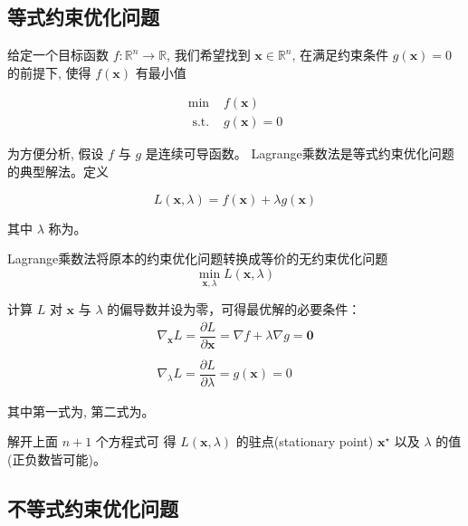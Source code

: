\subsection{等式约束优化问题}

\begin{problem}[等式约束优化问题]
    给定一个目标函数 $ f: \mathbb{R}^{n} \rightarrow \mathbb{R} $, 我们希望找到 $ \mathbf{x} \in \mathbb{R}^{n} $, 在满足约束条件 $ g(\mathbf{x})=0 $ 的前提下, 使得 $ f(\mathbf{x}) $ 有最小值

    $$
\begin{array}{ll}
\min & f(\mathbf{x}) \\
\text { s.t. } & g(\mathbf{x})=0
\end{array}
$$
\end{problem}

为方便分析, 假设 $ f $ 与 $ g $ 是连续可导函数。 Lagrange乘数法是等式约束优化问题的典型解法。定义

\begin{definition}[Lagrangian函数]
    $$
L(\mathbf{x}, \lambda)=f(\mathbf{x})+\lambda g(\mathbf{x})
$$
\end{definition}

其中 $ \lambda $ 称为。 

\begin{theorem}
    Lagrange乘数法将原本的约束优化问题转换成等价的无约束优化问题
$$
\min _{\mathbf{x}, \lambda} L(\mathbf{x}, \lambda)
$$
\end{theorem}

\begin{theorem}[拉格朗日乘子法最优解必要条件]
    计算 $ L $ 对 $ \mathbf{x} $ 与 $ \lambda $ 的偏导数并设为零，可得最优解的必要条件：
$$
\begin{array}{l}
\nabla_{\mathbf{x}} L=\dfrac{\partial L}{\partial \mathbf{x}}=\nabla f+\lambda \nabla g=\mathbf{0} \\
\\
\nabla_{\lambda} L=\dfrac{\partial L}{\partial \lambda}=g(\mathbf{x})=0
\end{array}
$$

其中第一式为, 第二式为。
\end{theorem}


解开上面 $ n+1 $ 个方程式可 得 $ L(\mathbf{x}, \lambda) $ 的驻点(stationary point) $ \mathbf{x}^{\star} $ 以及 $ \lambda $ 的值(正负数皆可能)。

\subsection{不等式约束优化问题}

